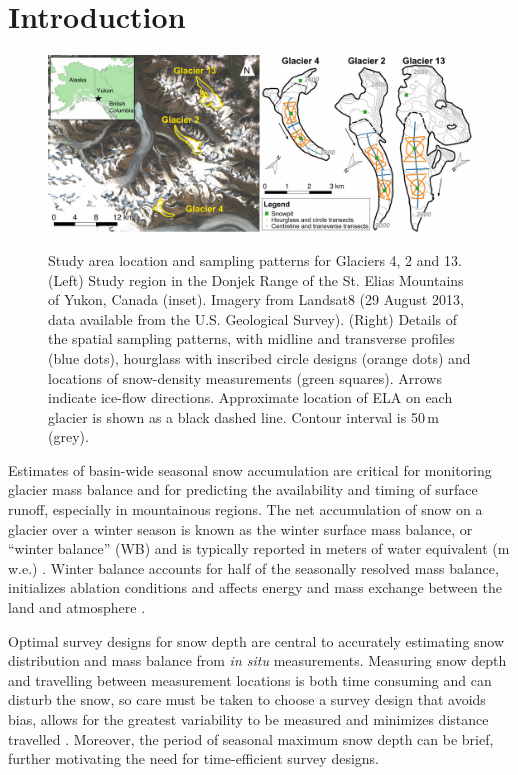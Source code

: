 \documentclass[twocolumn,letterpaper]{igs}
\begin{document}
\section{Introduction}

\begin{figure}
	\centering
	\includegraphics[width =\textwidth]{PaperII-StudySite.pdf}\\
	\caption{Study area location and sampling patterns for Glaciers 4, 2 and 13. (Left) Study region in the Donjek Range of the St. Elias Mountains of Yukon, Canada (inset). Imagery from Landsat8 (29 August 2013, data available from the U.S. Geological Survey). (Right) Details of the spatial sampling patterns, with midline and transverse profiles (blue dots), hourglass with inscribed circle designs (orange dots) and locations of snow-density measurements (green squares). Arrows indicate ice-flow directions. Approximate location of ELA on each glacier is shown as a black dashed line. Contour interval is 50\,m (grey).}
	\label{fig:Sampling}
\end{figure} 

Estimates of basin-wide seasonal snow accumulation are critical for monitoring glacier mass balance and for predicting the availability and timing of surface runoff, especially in mountainous regions. The net accumulation of snow on a glacier over a winter season is known as the winter surface mass balance, or ``winter balance'' (WB) and is typically reported in meters of water equivalent (m\,w.e.) \citep{Cogley2011}. Winter balance accounts for half of the seasonally resolved mass balance, initializes ablation conditions and affects energy and mass exchange between the land and atmosphere \citep[e.g.][]{Hock2005, Reveillet2016}. 

Optimal survey designs for snow depth  are central to accurately estimating snow distribution and mass balance from \textit{in situ} measurements. Measuring snow depth and travelling between measurement locations is both time consuming and can disturb the snow, so care must be taken to choose a survey design that avoids bias, allows for the greatest variability to be measured and minimizes distance travelled \citep[e.g.][]{Shea2010,Kinar2015}. Moreover, the period of seasonal maximum snow depth can be brief, further motivating the need for time-efficient survey designs. 
\end{document}
